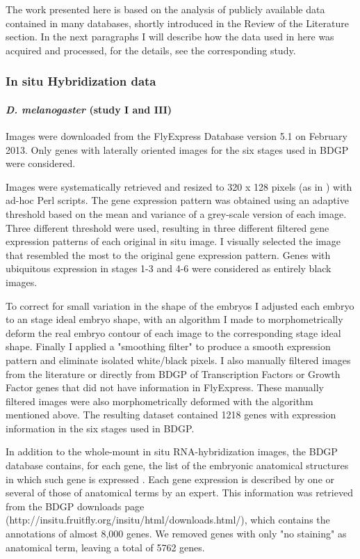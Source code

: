 The work presented here is based on the analysis of publicly available data contained in many databases, shortly introduced in the Review of the Literature section. In the next paragraphs I will describe how the data used in here was acquired and processed, for the details, see the corresponding study.

\subsubsection{In situ Hybridization data}

\paragraph{\textit{D. melanogaster} (study I and III)}

Images were downloaded from the FlyExpress Database version 5.1 \citep{Kumar2011} on February 2013. Only genes with laterally oriented images for the six stages used in BDGP \citep{Tomancak2002} were considered.

Images were systematically retrieved and resized to 320 x 128 pixels (as in \citealp{Konikoff2012}) with ad-hoc Perl scripts.
%
The gene expression pattern was obtained using an adaptive threshold based on the mean and variance of a grey-scale version of each image. Three different threshold were used, resulting in three different filtered gene expression patterns of each original in situ image. I visually selected the image that resembled the most to the original gene expression pattern. Genes with ubiquitous expression in stages 1-3 and 4-6 were considered as entirely black images.

To correct for small variation in the shape of the embryos I adjusted each embryo to an stage ideal embryo shape, with an algorithm I made to morphometrically deform the real embryo contour of each image to the corresponding stage ideal shape.
Finally I applied a "smoothing filter" to produce a smooth expression pattern and eliminate isolated white/black pixels. I also manually filtered images from the literature or directly from BDGP of Transcription Factors or Growth Factor genes that did not have information in FlyExpress. These manually filtered images were also morphometrically deformed with the algorithm mentioned above. The resulting dataset contained 1218 genes with expression information in the six stages used in BDGP.

In addition to the whole-mount in situ RNA-hybridization images, the BDGP database contains, for each gene, the list of the embryonic anatomical structures in which such gene is expressed \citep{Tomancak2007}. Each gene expression is described by one or several of those of anatomical terms by an expert. 
This information was retrieved from the BDGP downloads page (http://insitu.fruitfly.org/insitu/html/downloads.html/), which contains the annotations of almost 8,000 genes. We removed genes with only "no staining" as anatomical term, leaving a total of 5762 genes.

